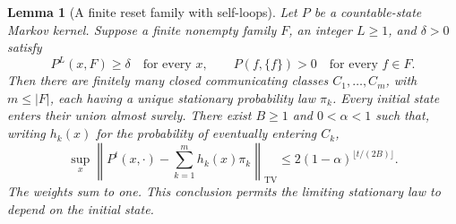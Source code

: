 \documentclass[11pt]{article}
\newtheorem{lemma}[theorem]{Lemma}
\newcommand{\TV}{\mathrm{TV}}
\begin{document}
\begin{lemma}[A finite reset family with self-loops]
\label{lem:finiteclasses}
Let $P$ be a countable-state Markov kernel. Suppose a finite
nonempty family $F$, an integer $L\ge1$, and $\delta>0$ satisfy
\[
 P^L(x,F)\ge\delta\quad\text{for every }x,
 \qquad P(f,\{f\})>0\quad\text{for every }f\in F.
\]
Then there are finitely many closed communicating classes
$C_1,\ldots,C_m$, with $m\le |F|$, each having a unique stationary
probability law $\pi_k$. Every initial state enters their union
almost surely. There exist $B\ge1$ and $0<\alpha<1$ such that,
writing $h_k(x)$ for the probability of eventually entering $C_k$,
\begin{equation}
 \sup_x\left\|P^t(x,\cdot)-
                 \sum_{k=1}^m h_k(x)\pi_k\right\|_{\TV}
 \le 2(1-\alpha)^{\lfloor t/(2B)\rfloor}.
 \label{eq:multiclass}
\end{equation}
The weights sum to one. This conclusion permits the limiting
stationary law to depend on the initial state.
\end{lemma}
\end{document}
